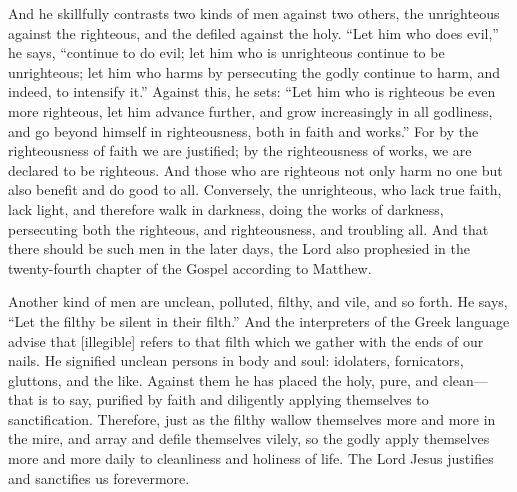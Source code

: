 And he skillfully contrasts two kinds of men against two others, the unrighteous against the righteous, and the defiled against the holy. “Let him who does evil,” he says, “continue to do evil; let him who is unrighteous continue to be unrighteous; let him who harms by persecuting the godly continue to harm, and indeed, to intensify it.” Against this, he sets: “Let him who is righteous be even more righteous, let him advance further, and grow increasingly in all godliness, and go beyond himself in righteousness, both in faith and works.” For by the righteousness of faith we are justified; by the righteousness of works, we are declared to be righteous. And those who are righteous not only harm no one but also benefit and do good to all. Conversely, the unrighteous, who lack true faith, lack light, and therefore walk in darkness, doing the works of darkness, persecuting both the righteous, and righteousness, and troubling all. And that there should be such men in the later days, the Lord also prophesied in the twenty-fourth chapter of the Gospel according to Matthew.

Another kind of men are unclean, polluted, filthy, and vile, and so forth. He says, “Let the filthy be silent in their filth.” And the interpreters of the Greek language advise that [illegible] refers to that filth which we gather with the ends of our nails. He signified unclean persons in body and soul: idolaters, fornicators, gluttons, and the like. Against them he has placed the holy, pure, and clean—that is to say, purified by faith and diligently applying themselves to sanctification. Therefore, just as the filthy wallow themselves more and more in the mire, and array and defile themselves vilely, so the godly apply themselves more and more daily to cleanliness and holiness of life. The Lord Jesus justifies and sanctifies us forevermore.
